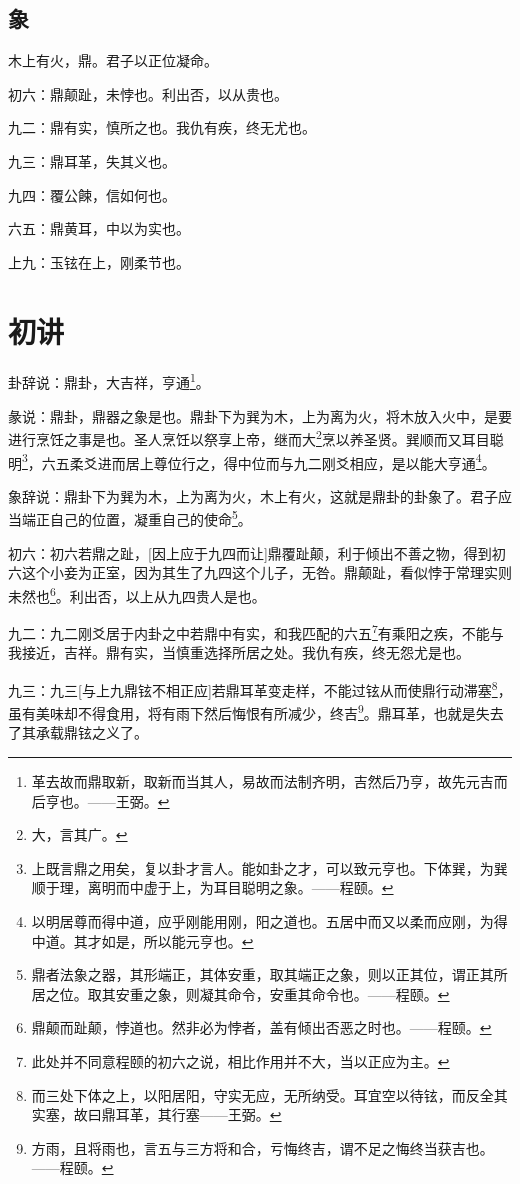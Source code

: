 \documentclass[12pt,oneside]{book}
\begin{document}
\subsection{象}
木上有火，鼎。君子以正位凝命。

初六：鼎颠趾，未悖也。利出否，以从贵也。

九二：鼎有实，慎所之也。我仇有疾，终无尤也。

九三：鼎耳革，失其义也。

九四：覆公餗，信如何也。

六五：鼎黄耳，中以为实也。

上九：玉铉在上，刚柔节也。

\section{初讲}
卦辞说：鼎卦，大吉祥，亨通\footnote{革去故而鼎取新，取新而当其人，易故而法制齐明，吉然后乃亨，故先元吉而后亨也。——王弼。}。

彖说：鼎卦，鼎器之象是也。鼎卦下为巽为木，上为离为火，将木放入火中，是要进行烹饪之事是也。圣人烹饪以祭享上帝，继而大\footnote{大，言其广。}烹以养圣贤。巽顺而又耳目聪明\footnote{上既言鼎之用矣，复以卦才言人。能如卦之才，可以致元亨也。下体巽，为巽顺于理，离明而中虚于上，为耳目聪明之象。——程颐。}，六五柔爻进而居上尊位行之，得中位而与九二刚爻相应，是以能大亨通\footnote{以明居尊而得中道，应乎刚能用刚，阳之道也。五居中而又以柔而应刚，为得中道。其才如是，所以能元亨也。}。

象辞说：鼎卦下为巽为木，上为离为火，木上有火，这就是鼎卦的卦象了。君子应当端正自己的位置，凝重自己的使命\footnote{鼎者法象之器，其形端正，其体安重，取其端正之象，则以正其位，谓正其所居之位。取其安重之象，则凝其命令，安重其命令也。——程颐。}。


初六：初六若鼎之趾，[因上应于九四而让]鼎覆趾颠，利于倾出不善之物，得到初六这个小妾为正室，因为其生了九四这个儿子，无咎。鼎颠趾，看似悖于常理实则未然也\footnote{鼎颠而趾颠，悖道也。然非必为悖者，盖有倾出否恶之时也。——程颐。}。利出否，以上从九四贵人是也。

九二：九二刚爻居于内卦之中若鼎中有实，和我匹配的六五\footnote{此处并不同意程颐的初六之说，相比作用并不大，当以正应为主。}有乘阳之疾，不能与我接近，吉祥。鼎有实，当慎重选择所居之处。我仇有疾，终无怨尤是也。

九三：九三[与上九鼎铉不相正应]若鼎耳革变走样，不能过铉从而使鼎行动滞塞\footnote{而三处下体之上，以阳居阳，守实无应，无所纳受。耳宜空以待铉，而反全其实塞，故曰鼎耳革，其行塞——王弼。}，虽有美味却不得食用，将有雨下然后悔恨有所减少，终吉\footnote{方雨，且将雨也，言五与三方将和合，亏悔终吉，谓不足之悔终当获吉也。——程颐。}。鼎耳革，也就是失去了其承载鼎铉之义了。
\end{document}
